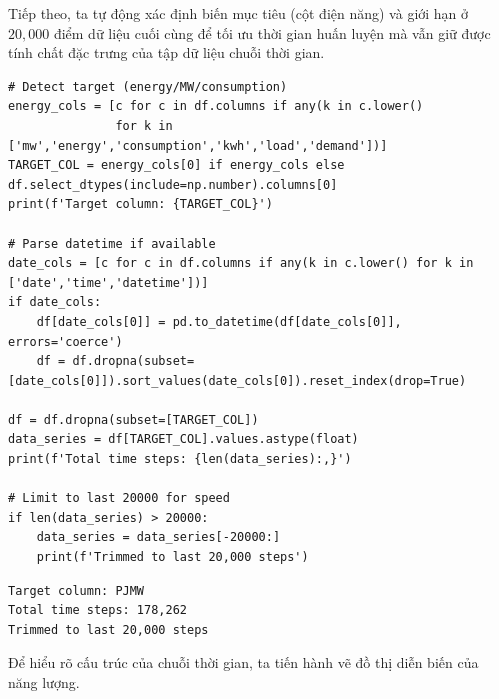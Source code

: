 Tiếp theo, ta tự động xác định biến mục tiêu (cột điện năng) và giới hạn ở $20,000$ điểm dữ liệu cuối cùng để tối ưu thời gian huấn luyện mà vẫn giữ được tính chất đặc trưng của tập dữ liệu chuỗi thời gian.

\begin{lstlisting}[style=pythoncode, caption={Lựa chọn biến mục tiêu (Target) và lấy mẫu (Sampling)}]
# Detect target (energy/MW/consumption)
energy_cols = [c for c in df.columns if any(k in c.lower()
               for k in ['mw','energy','consumption','kwh','load','demand'])]
TARGET_COL = energy_cols[0] if energy_cols else df.select_dtypes(include=np.number).columns[0]
print(f'Target column: {TARGET_COL}')

# Parse datetime if available
date_cols = [c for c in df.columns if any(k in c.lower() for k in ['date','time','datetime'])]
if date_cols:
    df[date_cols[0]] = pd.to_datetime(df[date_cols[0]], errors='coerce')
    df = df.dropna(subset=[date_cols[0]]).sort_values(date_cols[0]).reset_index(drop=True)

df = df.dropna(subset=[TARGET_COL])
data_series = df[TARGET_COL].values.astype(float)
print(f'Total time steps: {len(data_series):,}')

# Limit to last 20000 for speed
if len(data_series) > 20000:
    data_series = data_series[-20000:]
    print(f'Trimmed to last 20,000 steps')
\end{lstlisting}

\begin{lstlisting}[style=consoleoutput, caption={Output: Lựa chọn cột Target}]
Target column: PJMW
Total time steps: 178,262
Trimmed to last 20,000 steps
\end{lstlisting}

Để hiểu rõ cấu trúc của chuỗi thời gian, ta tiến hành vẽ đồ thị diễn biến của năng lượng.

